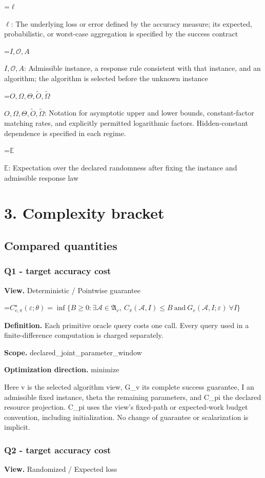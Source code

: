 \documentclass[10pt,a4paper]{article}
\newcommand{\AtlasMath}[1]{\par\begingroup\centering\setbox0=\hbox{$\displaystyle #1$}\ifdim\wd0>1.4\linewidth\typeout{ATLAS WIDE FORMULA: \the\wd0}\fi\ifdim\wd0>\linewidth\resizebox{\linewidth}{!}{\box0}\else\box0\fi\par\endgroup}
\newcommand{\AtlasInlineMath}[1]{\begingroup\setbox0=\hbox{$#1$}\ifdim\wd0>.4\linewidth\endgroup\AtlasMath{#1}\else\endgroup$#1$\fi}
\begin{document}
\AtlasInlineMath{\ell}: The underlying loss or error defined by the accuracy measure; its expected, probabilistic, or worst-case aggregation is specified by the success contract

\AtlasInlineMath{I,\mathcal{O},A}: Admissible instance, a response rule consistent with that instance, and an algorithm; the algorithm is selected before the unknown instance

\AtlasInlineMath{O,\Omega,\Theta,\widetilde{O},\widetilde\Omega}: Notation for asymptotic upper and lower bounds, constant-factor matching rates, and explicitly permitted logarithmic factors. Hidden-constant dependence is specified in each regime.

\AtlasInlineMath{\mathbb{E}}: Expectation over the declared randomness after fixing the instance and admissible response law

\section{3. Complexity bracket}
\subsection{Compared quantities}
\subsubsection{Q1 - target accuracy cost}
\textbf{View.} Deterministic / Pointwise guarantee

\AtlasMath{C^\star_{v,\pi}(\varepsilon;\theta)=\inf\{B\ge0:\exists\mathcal A\in\mathfrak A_v,\ C_\pi(\mathcal A,I)\le B\ \text{and}\ G_v(\mathcal A,I;\varepsilon)\ \forall I\}}
\textbf{Definition.} Each primitive oracle query costs one call. Every query used in a finite-difference computation is charged separately.

\textbf{Scope.} declared\_joint\_parameter\_window

\textbf{Optimization direction.} minimize

Here v is the selected algorithm view, G\_v its complete success guarantee, I an admissible fixed instance, theta the remaining parameters, and C\_pi the declared resource projection. C\_pi uses the view's fixed-path or expected-work budget convention, including initialization. No change of guarantee or scalarization is implicit.

\subsubsection{Q2 - target accuracy cost}
\textbf{View.} Randomized / Expected loss
\end{document}
